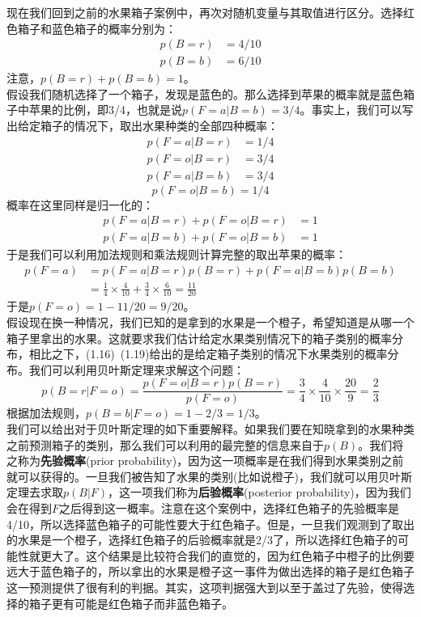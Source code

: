 \documentclass[b5paper]{book}
\numberwithin{equation}{chapter}
\begin{document}
{	\indent 现在我们回到之前的水果箱子案例中，再次对随机变量与其取值进行区分。选择红色箱子和蓝色箱子的概率分别为：
	\begin{align}
		p(B=r)&=4/10 \\
		p(B=b)&=6/10
	\end{align}
	\indent 注意，$p(B=r)+p(B=b)=1$。\\
	\indent 假设我们随机选择了一个箱子，发现是蓝色的。那么选择到苹果的概率就是蓝色箱子中苹果的比例，即3/4，也就是说$p(F=a|B=b)=3/4$。事实上，我们可以写出给定箱子的情况下，取出水果种类的全部四种概率：
	\begin{align}
		p(F=a|B=r) &=1/4 \\
		p(F=o|B=r) &=3/4 \\
		p(F=a|B=b) &=3/4 
	\end{align}
	\begin{equation}
		p(F=o|B=b) =1/4 
	\end{equation}
	\indent 概率在这里同样是归一化的：
	\begin{align}
		p(F=a|B=r)+p(F=o|B=r) &=1 \\
		p(F=a|B=b)+p(F=o|B=b) &=1
	\end{align}
	\indent 于是我们可以利用加法规则和乘法规则计算完整的取出苹果的概率：
	\begin{equation}
		\begin{split}
			p(F=a) &= p(F=a|B=r)p(B=r)+p(F=a|B=b)p(B=b) \\ 
			&= \frac{1}{4}\times\frac{4}{10}+\frac{3}{4}\times\frac{6}{10} = \frac{11}{20}
		\end{split}
	\end{equation}
	\indent 于是$p(F=o)=1-11/20 = 9/20$。\\
	\indent 假设现在换一种情况，我们已知的是拿到的水果是一个橙子，希望知道是从哪一个箱子里拿出的水果。这就要求我们估计给定水果类别情况下的箱子类别的概率分布，相比之下，(1.16)~(1.19)给出的是给定箱子类别的情况下水果类别的概率分布。我们可以利用贝叶斯定理来求解这个问题：
	\begin{equation}
		p(B=r|F=o)=\frac{p(F=o|B=r)p(B=r)}{p(F=o)}=\frac{3}{4} \times \frac{4}{10} \times \frac{20}{9} = \frac{2}{3}
	\end{equation}
	\indent 根据加法规则，$p(B=b|F=o)=1-2/3=1/3$。\\
	\indent 我们可以给出对于贝叶斯定理的如下重要解释。如果我们要在知晓拿到的水果种类之前预测箱子的类别，那么我们可以利用的最完整的信息来自于$p(B)$。我们将之称为\textbf{先验概率}(prior probability)，因为这一项概率是在我们得到水果类别之前就可以获得的。一旦我们被告知了水果的类别(比如说橙子)，我们就可以用贝叶斯定理去求取$p(B|F)$，这一项我们称为\textbf{后验概率}(posterior probability)，因为我们会在得到$F$之后得到这一概率。注意在这个案例中，选择红色箱子的先验概率是4/10，所以选择蓝色箱子的可能性要大于红色箱子。但是，一旦我们观测到了取出的水果是一个橙子，选择红色箱子的后验概率就是2/3了，所以选择红色箱子的可能性就更大了。这个结果是比较符合我们的直觉的，因为红色箱子中橙子的比例要远大于蓝色箱子的，所以拿出的水果是橙子这一事件为做出选择的箱子是红色箱子这一预测提供了很有利的判据。其实，这项判据强大到以至于盖过了先验，使得选择的箱子更有可能是红色箱子而非蓝色箱子。\\
}
\end{document}
